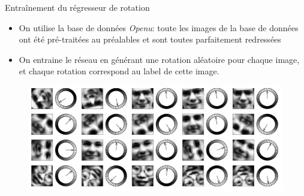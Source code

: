 \documentclass[compress]{beamer}
\begin{document}
\begin{frame}{Entraînement du régresseur de rotation}
  \begin{itemize}
    \item On utilise la base de données \textit{Openu}:
      toute les images de la base de données ont été pré-traitées au préalables et sont toutes parfaitement redressées
    \item On entraine le réseau en générant une rotation aléatoire pour chaque image, et chaque rotation correspond au label de cette image.
  \end{itemize}
  \begin{figure}
    \includegraphics[width=0.6\linewidth]{resources/rotation}
  \end{figure}
\end{frame}
\end{document}
